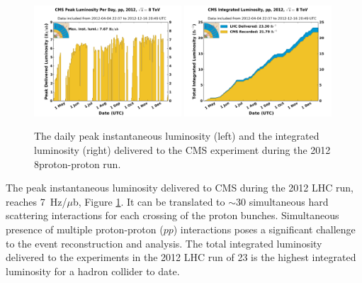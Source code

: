 \begin{figure}[htbp]
\centering
\includegraphics[width=0.49\textwidth]{plots/intro/peak_lumi.pdf}
\includegraphics[width=0.49\textwidth]{plots/intro/int_lumi.pdf}
\caption{The daily peak instantaneous luminosity (left) and the integrated luminosity (right)
 delivered to the CMS experiment during the 2012 8\TeV proton-proton run.\label{fig:lumi}}
\end{figure}

The peak instantaneous luminosity delivered to CMS during the 2012 LHC run, 
 reaches 7~Hz/$\mu$b, Figure \ref{fig:lumi}. 
It can be translated to $\sim$30 simultaneous hard scattering interactions 
for each 
crossing of the proton bunches. Simultaneous presence of multiple proton-proton ($pp$) interactions
 poses a significant challenge to the event reconstruction and analysis.
 The total integrated luminosity 
delivered to the experiments in the 2012 LHC run of 23 \fbinv 
is the highest integrated luminosity for a hadron collider 
to date.
